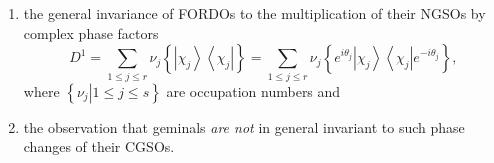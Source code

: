 \documentclass[aps,preprint]{revtex4}%
\begin{document}
\begin{enumerate}
\item the general invariance of FORDOs to the multiplication of their NGSOs by
complex phase factors
\begin{equation}
D^{1}=\sum_{1\leq j\leq r}\nu_{j}\left\{  \left\vert \chi_{j}\right\rangle
\left\langle \chi_{j}\right\vert \right\}  =\sum_{1\leq j\leq r}\nu
_{j}\left\{  e^{i\theta_{j}}\left\vert \chi_{j}\right\rangle \left\langle
\chi_{j}\right\vert e^{-i\theta_{j}}\right\}  ,
\end{equation}
where $\left\{  \left.  \nu_{j}\right\vert 1\leq j\leq s\right\}  $ are
occupation numbers and

\item the observation that geminals \emph{are not }in general invariant to
such phase changes of their CGSOs.
\end{enumerate}
\end{document}
